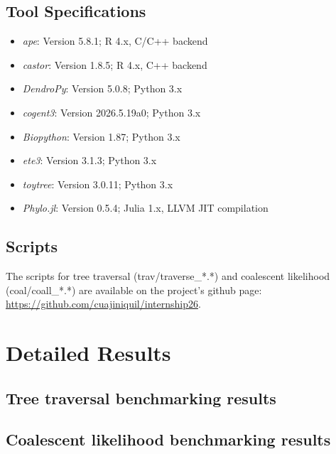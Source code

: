 \documentclass[11pt, a4paper]{article}
\newcommand{\ape}{\textit{ape}}
\newcommand{\dendropy}{\textit{DendroPy}}
\newcommand{\cogent}{\textit{cogent3}}
\newcommand{\biopython}{\textit{Biopython}}
\newcommand{\ete}{\textit{ete3}}
\newcommand{\toytree}{\textit{toytree}}
\newcommand{\phylo}{\textit{Phylo.jl}}
\newcommand{\castor}{\textit{castor}}
\begin{document}
\subsection{Tool Specifications}

\begin{itemize}
    \item \ape: Version 5.8.1; R 4.x, C/C++ backend
    \item \castor: Version 1.8.5; R 4.x, C++ backend
    \item \dendropy: Version 5.0.8; Python 3.x
    \item \cogent: Version 2026.5.19a0; Python 3.x
    \item \biopython: Version 1.87; Python 3.x
    \item \ete: Version 3.1.3; Python 3.x
    \item \toytree: Version 3.0.11; Python 3.x
    \item \phylo: Version 0.5.4; Julia 1.x, LLVM JIT compilation
\end{itemize}

\subsection{Scripts}
The scripts for tree traversal (trav/traverse\_*.*) and coalescent likelihood (coal/coall\_*.*) are available on the project's github page: \url{https://github.com/cuajiniquil/internship26}.

\section{Detailed Results}

\subsection{Tree traversal benchmarking results}



\subsection{Coalescent likelihood benchmarking results}


\end{document}
